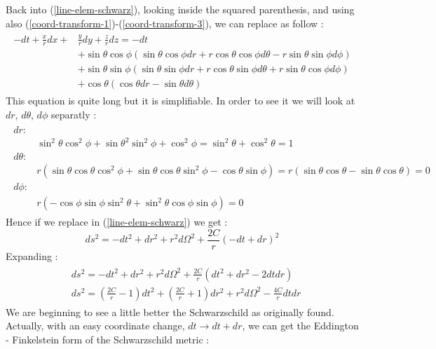 \documentclass[a4paper,12pt]{article}
\theoremstyle{definition}
\begin{document}
Back into (\ref{line-elem-schwarz}), looking inside the squared parenthesis, and using also (\ref{coord-transform-1})-(\ref{coord-transform-3}), we can replace as follow :
\begin{align}
\begin{split}
	-dt+\frac{x}{r}dx+&\frac{y}{r}dy+\frac{z}{r}dz =-dt\\
	&+\sin{\theta} \cos{\phi} (\sin{\theta} \cos{\phi} dr+r\cos{\theta} \cos{\phi} d\theta -r\sin{\theta} \sin{\phi} d\phi )\\
	&+\sin{\theta} \sin{\phi} (\sin{\theta} \sin{\phi} dr+r\cos{\theta} \sin{\phi} d\theta +r\sin{\theta} \cos{\phi} d\phi )\\
	&+\cos{\theta} (\cos{\theta} dr-\sin{\theta} d\theta )
\end{split}
\end{align}
This equation is quite long but it is simplifiable. In order to see it  we will look at $dr$, $d\theta$, $d\phi$ separatly :
\begin{align}
\begin{split}
	dr :& \\
	&\sin^2{\theta}\cos^2{\phi}+\sin{\theta}^2\sin^2{\phi}+\cos^2{\phi}=\sin^2{\theta}+\cos^2{\theta}=1\\
	d\theta :& \\
	&r(\sin{\theta}\cos{\theta}\cos^2{\phi}+\sin{\theta}\cos{\theta}\sin^2{\phi}-\cos{\theta}\sin{\phi})=r(\sin{\theta}\cos{\theta}-\sin{\theta}\cos{\theta})=0\\
	d\phi :& \\
	&r(-\cos{\phi}\sin{\phi}\sin^2{\theta}+\sin^2{\theta}\cos{\phi}\sin{\phi})=0
\end{split}
\end{align}
Hence if we replace in (\ref{line-elem-schwarz}) we get :
\begin{equation}
	ds^2=-dt^2+dr^2+r^2d\Omega^2+\frac{2C}{r}(-dt+dr)^2
\end{equation}
Expanding :
\begin{align}
\begin{split}
	&ds^2=-dt^2+dr^2+r^2d\Omega^2+\frac{2C}{r}(dt^2+dr^2-2dtdr)\\
	&ds^2=(\frac{2C}{r}-1)dt^2+(\frac{2C}{r}+1)dr^2+r^2d\Omega^2-\frac{4C}{r}dtdr
\end{split}
\end{align}
We are beginning to see a little better the Schwarzschild as originally found.
Actually, with an easy coordinate change, $dt\rightarrow dt+dr$, we can get the Eddington - Finkelstein form of the Schwarzschild metric :
\end{document}
